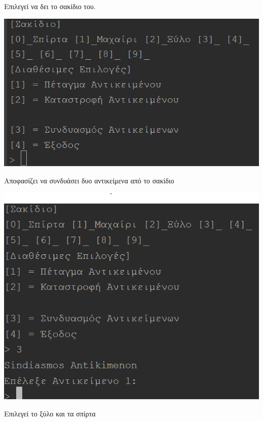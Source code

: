 \noindent 
Επιλεγεί να δει το σακίδιο του.
\begin{center}
			\includegraphics[width=1\textwidth]{image/3.4.PNG}
\end{center}
\noindent
Αποφασίζει να συνδυάσει δυο αντικείμενα από το σακίδιο
\begin{center}
			\includegraphics[width=1\textwidth]{image/3.5.PNG}
\end{center}

\noindent
Επιλεγεί το ξύλο και τα σπίρτα

